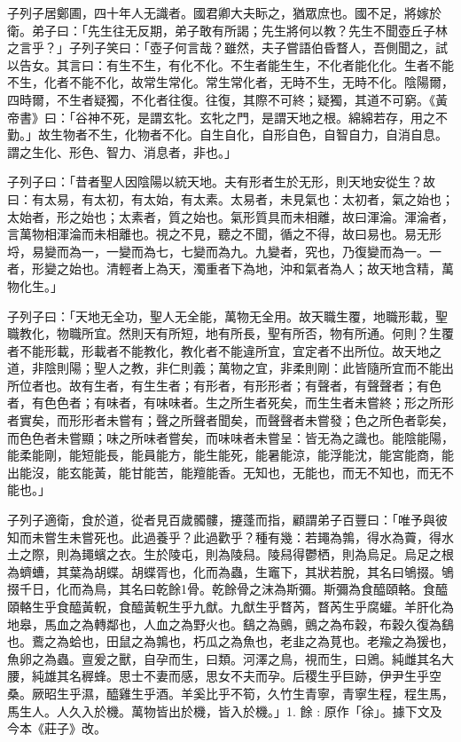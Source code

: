 
\begin{pinyinscope}
子列子居鄭圃，四十年人无識者。國君卿大夫眎之，猶眾庶也。國不足，將嫁於衛。弟子曰：「先生往无反期，弟子敢有所謁；先生將何以教？先生不聞壺丘子林之言乎？」子列子笑曰：「壺子何言哉？雖然，夫子嘗語伯昏瞀人，吾側聞之，試以告女。其言曰：有生不生，有化不化。不生者能生生，不化者能化化。生者不能不生，化者不能不化，故常生常化。常生常化者，无時不生，无時不化。陰陽爾，四時爾，不生者疑獨，不化者往復。往復，其際不可終；疑獨，其道不可窮。《黃帝書》曰：「谷神不死，是謂玄牝。玄牝之門，是謂天地之根。綿綿若存，用之不勤。」故生物者不生，化物者不化。自生自化，自形自色，自智自力，自消自息。謂之生化、形色、智力、消息者，非也。」

子列子曰：「昔者聖人因陰陽以統天地。夫有形者生於无形，則天地安從生？故曰：有太易，有太初，有太始，有太素。太易者，未見氣也：太初者，氣之始也；太始者，形之始也；太素者，質之始也。氣形質具而未相離，故曰渾淪。渾淪者，言萬物相渾淪而未相離也。視之不見，聽之不聞，循之不得，故曰易也。易无形埒，易變而為一，一變而為七，七變而為九。九變者，究也，乃復變而為一。一者，形變之始也。清輕者上為天，濁重者下為地，沖和氣者為人；故天地含精，萬物化生。」

子列子曰：「天地无全功，聖人无全能，萬物无全用。故天職生覆，地職形載，聖職教化，物職所宜。然則天有所短，地有所長，聖有所否，物有所通。何則？生覆者不能形載，形載者不能教化，教化者不能違所宜，宜定者不出所位。故天地之道，非陰則陽；聖人之教，非仁則義；萬物之宜，非柔則剛：此皆隨所宜而不能出所位者也。故有生者，有生生者；有形者，有形形者；有聲者，有聲聲者；有色者，有色色者；有味者，有味味者。生之所生者死矣，而生生者未嘗終；形之所形者實矣，而形形者未嘗有；聲之所聲者聞矣，而聲聲者未嘗發；色之所色者彰矣，而色色者未嘗顯；味之所味者嘗矣，而味味者未嘗呈：皆无為之識也。能陰能陽，能柔能剛，能短能長，能員能方，能生能死，能暑能涼，能浮能沈，能宮能商，能出能沒，能玄能黃，能甘能苦，能羶能香。无知也，无能也，而无不知也，而无不能也。」

子列子適衛，食於道，從者見百歲髑髏，攓蓬而指，顧謂弟子百豐曰：「唯予與彼知而未嘗生未嘗死也。此過養乎？此過歡乎？種有幾：若䵷為鶉，得水為藚，得水土之際，則為䵷蠙之衣。生於陵屯，則為陵舄。陵舄得鬱栖，則為烏足。烏足之根為蠐螬，其葉為胡蝶。胡蝶胥也，化而為蟲，生竈下，其狀若脫，其名曰鴝掇。鴝掇千日，化而為鳥，其名曰乾餘1骨。乾餘骨之沫為斯彌。斯彌為食醯頤輅。食醯頤輅生乎食醯黃軦，食醯黃軦生乎九猷。九猷生乎瞀芮，瞀芮生乎腐蠸。羊肝化為地皋，馬血之為轉鄰也，人血之為野火也。鷂之為鸇，鸇之為布穀，布穀久復為鷂也。鷰之為蛤也，田鼠之為鶉也，朽瓜之為魚也，老韭之為莧也。老羭之為猨也，魚卵之為蟲。亶爰之獸，自孕而生，曰類。河澤之鳥，視而生，曰鶂。純雌其名大腰，純雄其名稺蜂。思士不妻而感，思女不夫而孕。后稷生乎巨跡，伊尹生乎空桑。厥昭生乎濕，醯雞生乎酒。羊奚比乎不筍，久竹生青寧，青寧生程，程生馬，馬生人。人久入於機。萬物皆出於機，皆入於機。」1. 餘 : 原作「徐」。據下文及今本《莊子》改。


\end{pinyinscope}
